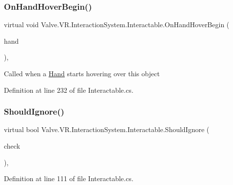 \subsubsection{\texorpdfstring{OnHandHoverBegin()}{OnHandHoverBegin()}}
{\footnotesize\ttfamily virtual void Valve.\+V\+R.\+Interaction\+System.\+Interactable.\+On\+Hand\+Hover\+Begin (\begin{DoxyParamCaption}\item[{\mbox{\hyperlink{class_valve_1_1_v_r_1_1_interaction_system_1_1_hand}{Hand}}}]{hand }\end{DoxyParamCaption})\hspace{0.3cm}{\ttfamily [protected]}, {\ttfamily [virtual]}}



Called when a \mbox{\hyperlink{class_valve_1_1_v_r_1_1_interaction_system_1_1_hand}{Hand}} starts hovering over this object 



Definition at line 232 of file Interactable.\+cs.

\mbox{\label{class_valve_1_1_v_r_1_1_interaction_system_1_1_interactable_a7097ad808a2fec8c884e31c81de46198}} 
\subsubsection{\texorpdfstring{ShouldIgnore()}{ShouldIgnore()}}
{\footnotesize\ttfamily virtual bool Valve.\+V\+R.\+Interaction\+System.\+Interactable.\+Should\+Ignore (\begin{DoxyParamCaption}\item[{Game\+Object}]{check }\end{DoxyParamCaption})\hspace{0.3cm}{\ttfamily [protected]}, {\ttfamily [virtual]}}



Definition at line 111 of file Interactable.\+cs.

\mbox{\label{class_valve_1_1_v_r_1_1_interaction_system_1_1_interactable_aa80dd17da786ba7b76a0c6a713f6443e}} 
